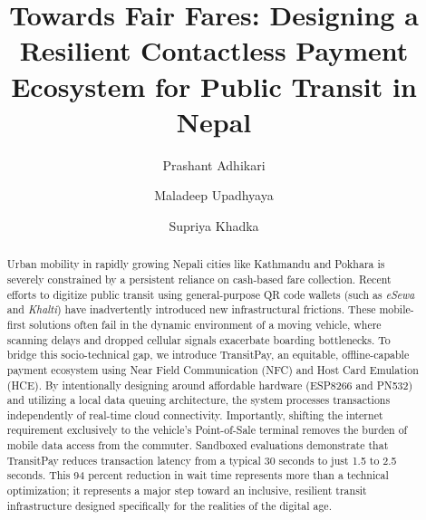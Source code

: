 \documentclass[manuscript,review,anonymous]{acmart}
\begin{document}
\title{Towards Fair Fares: Designing a Resilient Contactless Payment Ecosystem for Public Transit in Nepal}

\author{Prashant Adhikari}

\author{Maladeep Upadhyaya}


\author{Supriya Khadka}

\renewcommand{\shortauthors}{Adhikari et al.}

\begin{abstract}
Urban mobility in rapidly growing Nepali cities like Kathmandu and Pokhara is severely constrained by a persistent reliance on cash-based fare collection. Recent efforts to digitize public transit using general-purpose QR code wallets (such as \textit{eSewa} and \textit{Khalti}) have inadvertently introduced new infrastructural frictions. These mobile-first solutions often fail in the dynamic environment of a moving vehicle, where scanning delays and dropped cellular signals exacerbate boarding bottlenecks. To bridge this socio-technical gap, we introduce TransitPay, an equitable, offline-capable payment ecosystem using Near Field Communication (NFC) and Host Card Emulation (HCE). By intentionally designing around affordable hardware (ESP8266 and PN532) and utilizing a local data queuing architecture, the system processes transactions independently of real-time cloud connectivity. Importantly, shifting the internet requirement exclusively to the vehicle's Point-of-Sale terminal removes the burden of mobile data access from the commuter. Sandboxed evaluations demonstrate that TransitPay reduces transaction latency from a typical 30 seconds to just 1.5 to 2.5 seconds. This 94 percent reduction in wait time represents more than a technical optimization; it represents a major step toward an inclusive, resilient transit infrastructure designed specifically for the realities of the digital age.
\end{abstract}
\end{document}
